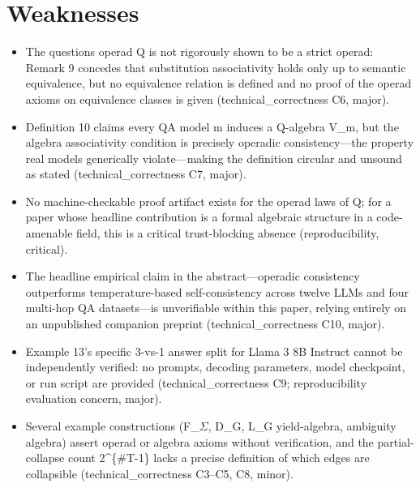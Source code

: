 \documentclass[11pt]{article}
\begin{document}
\section*{Weaknesses}
\begin{itemize}[leftmargin=*]
  \item The questions operad Q is not rigorously shown to be a strict operad: Remark 9 concedes that substitution associativity holds only up to semantic equivalence, but no equivalence relation is defined and no proof of the operad axioms on equivalence classes is given (technical\_correctness C6, major).
  \item Definition 10 claims every QA model m induces a Q-algebra V\_m, but the algebra associativity condition is precisely operadic consistency---the property real models generically violate---making the definition circular and unsound as stated (technical\_correctness C7, major).
  \item No machine-checkable proof artifact exists for the operad laws of Q; for a paper whose headline contribution is a formal algebraic structure in a code-amenable field, this is a critical trust-blocking absence (reproducibility, critical).
  \item The headline empirical claim in the abstract---operadic consistency outperforms temperature-based self-consistency across twelve LLMs and four multi-hop QA datasets---is unverifiable within this paper, relying entirely on an unpublished companion preprint (technical\_correctness C10, major).
  \item Example 13's specific 3-vs-1 answer split for Llama 3 8B Instruct cannot be independently verified: no prompts, decoding parameters, model checkpoint, or run script are provided (technical\_correctness C9; reproducibility evaluation concern, major).
  \item Several example constructions (F\_\ensuremath{\Sigma}, D\_G, L\_G yield-algebra, ambiguity algebra) assert operad or algebra axioms without verification, and the partial-collapse count 2\^{}\{\#T-1\} lacks a precise definition of which edges are collapsible (technical\_correctness C3--C5, C8, minor).
\end{itemize}
\end{document}
